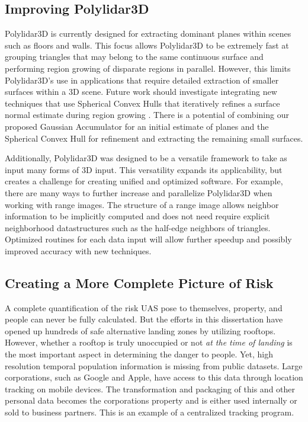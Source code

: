 \subsection{Improving Polylidar3D}

Polylidar3D is currently designed for extracting dominant planes within scenes such as floors and walls. This focus allows Polylidar3D to be extremely fast at grouping triangles that may belong to the same continuous surface and performing region growing of disparate regions in parallel. However, this limits Polylidar3D's use in applications that require detailed extraction of smaller surfaces within a 3D scene. Future work should investigate integrating new techniques that use Spherical Convex Hulls that iteratively refines a surface normal estimate during region growing \cite{mols_highly_2020}. There is a potential of combining our proposed Gaussian Accumulator for an initial estimate of planes and the Spherical Convex Hull for refinement and extracting the remaining small surfaces. 

Additionally, Polylidar3D was designed to be a versatile framework to take as input many forms of 3D input.  This versatility expands its applicability, but creates a challenge for creating unified and optimized software. For example, there are many ways to further increase and parallelize Polylidar3D when working with range images. The structure of a range image allows neighbor information to be implicitly computed and does not need require explicit neighborhood datastructures such as the half-edge neighbors of triangles. Optimized routines for each data input will allow further speedup and possibly improved accuracy with new techniques.


\subsection{Creating a More Complete Picture of Risk}

A complete quantification of the risk \ac{UAS} pose to themselves, property, and people can never be fully calculated. But the efforts in this dissertation have opened up hundreds of safe alternative landing zones by utilizing rooftops. However, whether a rooftop is truly unoccupied or not \emph{at the time of landing} is the most important aspect in determining the danger to people. Yet, high resolution temporal population information is missing from public datasets. Large corporations, such as Google and Apple, have access to this data through location tracking on mobile devices. The transformation and packaging of this and other personal data becomes the corporations property and is either used internally or sold to business partners. This is an example of a centralized tracking program.

